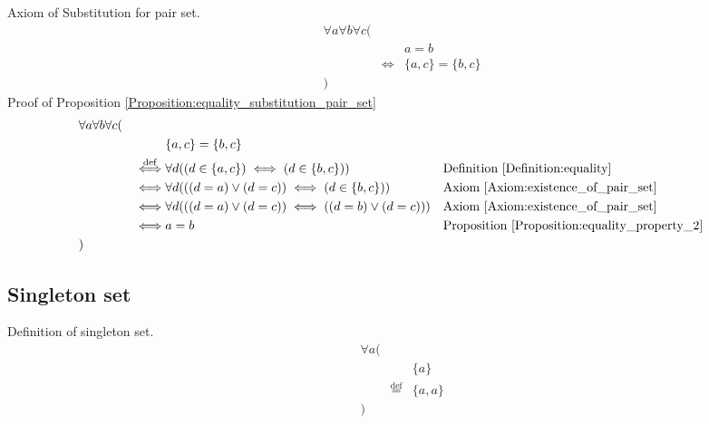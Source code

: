 \begin{prop}
\label{Proposition:equality_substitution_pair_set}
Axiom of Substitution for pair set.
\begin{align*}
& \forall a \forall b \forall c ( \\
& & & a = b \\
& & \iff & \{ a , c \} = \{ b , c \} \\
& )
\end{align*}
Proof of Proposition \ref{Proposition:equality_substitution_pair_set}
\begin{align*}
& \forall a \forall b \forall c ( \\
& & & \{ a , c \} = \{ b , c \} \\
& & \overset{\operatorname{def}}{\iff} & \forall d ((d \in \{ a , c \}) \iff (d \in \{ b , c \}))
& & \text{Definition \ref{Definition:equality}} \\
& & \iff & \forall d (((d = a) \lor (d = c)) \iff (d \in \{ b , c \}))
& & \text{Axiom \ref{Axiom:existence_of_pair_set}} \\
& & \iff & \forall d (((d = a) \lor (d = c)) \iff ((d = b) \lor (d = c)))
& & \text{Axiom \ref{Axiom:existence_of_pair_set}} \\
& & \iff & a = b
& & \text{Proposition \ref{Proposition:equality_property_2}} \\
& )
\end{align*}
\end{prop}

\subsection{Singleton set}
\begin{defn}
\label{Definition:singleton_set}
Definition of singleton set.
\begin{align*}
& \forall a ( \\
& & & \{ a \} \\
& & \overset{\operatorname{def}}{=} & \{ a , a \} \\
& )
\end{align*}
\end{defn}

